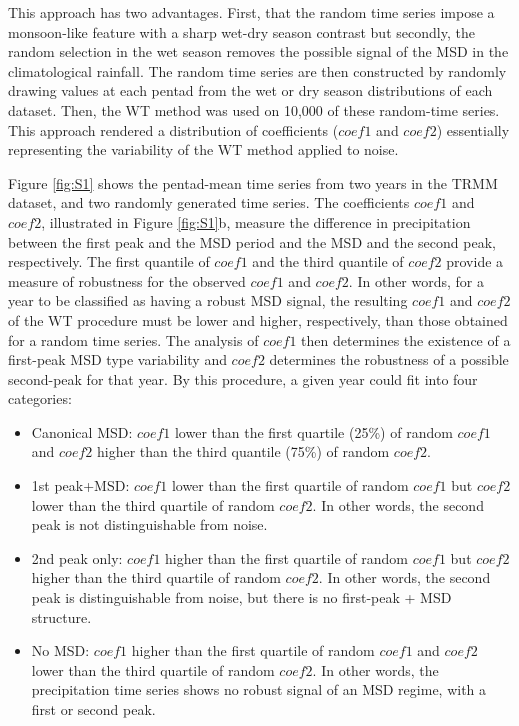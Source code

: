  
 This approach has two advantages. First, that the random time series impose a monsoon-like feature with a sharp wet-dry season contrast but secondly, the random selection in the wet season removes the possible signal of the MSD in the climatological rainfall.
 The random time series are then constructed by randomly drawing values at each pentad  from the wet or dry season distributions of each dataset.
 Then, the WT method was used on 10,000 of these random-time series. This approach rendered a distribution of coefficients ($coef1$ and $coef2$) essentially representing the variability of the WT method applied to noise.
 
  Figure \ref{fig:S1} shows the pentad-mean time series from two years in the TRMM dataset, and two randomly generated time series.
The coefficients $coef1$ and $coef2$, illustrated in Figure \ref{fig:S1}b, measure the difference in precipitation between the first peak and the MSD period and the MSD and the second peak, respectively. The first quantile of $coef1$ and the third quantile of $coef2$ provide a measure of robustness for the observed $coef1$ and $coef2$. In other words, for a year to be classified as having a robust MSD signal, the resulting $coef1$ and $coef2$ of the WT procedure must be lower and higher, respectively, than those obtained for a random time series.
The analysis of $coef1$ then determines the existence of a first-peak MSD type variability and $coef2$ determines the robustness of a possible second-peak for that year.
By this procedure, a given year could fit into four categories:

\begin{itemize}
\item Canonical MSD: $coef1$ lower than the first quartile (25\%) of random $coef1$ and $coef2$ higher than the third quantile (75\%) of random $coef2$.
\item 1st peak+MSD: $coef1$ lower than the first quartile of random $coef1$ but $coef2$ lower than the third quartile of random $coef2$. In other words, the second peak is not distinguishable from noise.
\item 2nd peak only: $coef1$ higher than the first quartile of random $coef1$ but $coef2$ higher than the third quartile of random $coef2$. In other words, the second peak is distinguishable from noise, but there is no first-peak + MSD structure.
\item No MSD: $coef1$ higher than the first quartile of random $coef1$ and $coef2$ lower than the third quartile of random $coef2$. In other words, the precipitation time series shows no robust signal of an MSD regime, with a first or second peak.
\end{itemize}
 
